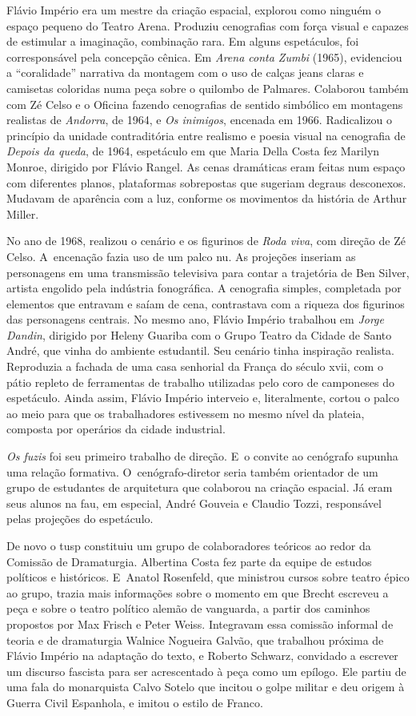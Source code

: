 Flávio Império era um mestre da criação espacial, explorou como ninguém
o espaço pequeno do Teatro Arena. Produziu cenografias com força visual
e capazes de estimular a imaginação, combinação rara. Em alguns
espetáculos, foi corresponsável pela concepção cênica. Em {\it Arena
conta Zumbi} (1965), evidenciou a “coralidade” narrativa da montagem com
o uso de calças jeans claras e camisetas coloridas numa peça sobre
o quilombo de Palmares. Colaborou também com Zé Celso e o Oficina
fazendo cenografias de sentido simbólico em montagens realistas de
{\it Andorra}, de 1964, e {\it Os inimigos}, encenada em 1966.
Radicalizou o princípio da unidade contraditória entre realismo e poesia
visual na cenografia de {\it Depois da queda}, de 1964, espetáculo em
que Maria Della Costa fez Marilyn Monroe, dirigido por Flávio Rangel. As
cenas dramáticas eram feitas num espaço com diferentes planos,
plataformas sobrepostas que sugeriam degraus desconexos. Mudavam de
aparência com a luz, conforme os movimentos da história de Arthur
Miller.

No ano de 1968, realizou o cenário e os figurinos de {\it Roda viva}, com
direção de Zé Celso. A~encenação fazia uso de um palco nu. As projeções
inseriam as personagens em uma transmissão televisiva para contar a
trajetória de Ben Silver, artista engolido pela indústria fonográfica. A
cenografia simples, completada por elementos que entravam e saíam de
cena, contrastava com a riqueza dos figurinos das personagens centrais.
No mesmo ano, Flávio Império trabalhou em {\it Jorge Dandin}, dirigido
por Heleny Guariba com o Grupo Teatro da Cidade de Santo André,
que vinha do ambiente estudantil. Seu cenário tinha inspiração realista.
Reproduzia a fachada de uma casa senhorial da França do século {\sc xvii}, com
o pátio repleto de ferramentas de trabalho utilizadas pelo coro de
camponeses do espetáculo. Ainda assim, Flávio Império interveio e, literalmente,
cortou o palco ao meio para que os trabalhadores
estivessem no mesmo nível da plateia, composta por operários da cidade
industrial.

{\it Os fuzis} foi seu primeiro trabalho de direção. E~o convite ao
cenógrafo supunha uma relação formativa. O~cenógrafo-diretor seria
também orientador de um grupo de estudantes de arquitetura que colaborou
na criação espacial. Já eram seus alunos na {\sc fau}, em especial, André
Gouveia e Claudio Tozzi, responsável pelas projeções do espetáculo.

De novo o {\sc tusp} constituiu um grupo de colaboradores teóricos ao redor da
Comissão de Dramaturgia. Albertina Costa fez parte da equipe de estudos
políticos e históricos. E~Anatol Rosenfeld, que ministrou cursos sobre teatro
épico ao grupo, trazia mais informações sobre o momento em que Brecht
escreveu a peça e sobre o teatro político alemão de vanguarda, a partir
dos caminhos propostos por Max Frisch e Peter Weiss. Integravam essa
comissão informal de teoria e de dramaturgia Walnice Nogueira Galvão,
que trabalhou próxima de Flávio Império na adaptação do texto, e Roberto
Schwarz, convidado a escrever um discurso fascista para ser acrescentado
à peça como um epílogo. Ele partiu de uma fala do monarquista Calvo Sotelo
que incitou o golpe militar e deu origem à Guerra Civil Espanhola, e
imitou o estilo de Franco.

